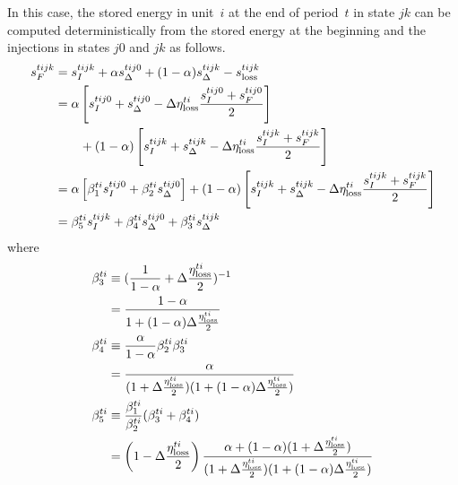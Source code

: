 \documentclass[12pt]{article}
\numberwithin{equation}{section}
\numberwithin{table}{section}
\numberwithin{figure}{section}
\begin{document}
In this case, the stored energy in unit~$i$ at the end of period~$t$ in state $jk$ can be computed deterministically from the stored energy at the beginning and the injections in states $j0$ and $jk$ as follows.
\begin{align}
s_F^{tijk} &= s_I^{tijk} + \alpha s_\Delta^{tij0} + (1 - \alpha) s_\Delta^{tijk} - s_{\rm loss}^{tijk} \\
&= \alpha \left[ s_I^{tij0} + s_\Delta^{tij0} - \Delta \eta^{ti}_{\rm loss} \frac{s_I^{tij0}+ s_F^{tij0}}{2} \right] \nonumber \\
& \qquad {} + (1-\alpha) \left[ s_I^{tijk} + s_\Delta^{tijk} - \Delta \eta^{ti}_{\rm loss} \frac{s_I^{tijk}+ s_F^{tijk}}{2} \right] \\
&= \alpha \left[ \beta_1^{ti} s_I^{tij0} + \beta_2^{ti} s_\Delta^{tij0} \right] + (1-\alpha) \left[ s_I^{tijk} + s_\Delta^{tijk} - \Delta \eta^{ti}_{\rm loss} \frac{s_I^{tijk}+ s_F^{tijk}}{2} \right] \\
&= \beta_5^{ti} s_I^{tijk} + \beta_4^{ti} s_\Delta^{tij0} + \beta_3^{ti} s_\Delta^{tijk}
\end{align}
where
\begin{align}
\beta_3^{ti} &\equiv (\frac{1}{1-\alpha} + \Delta \frac{\eta^{ti}_{\rm loss}}{2})^{-1} \nonumber \\
&= \frac{1-\alpha}{1+(1-\alpha) \Delta \frac{\eta^{ti}_{\rm loss}}{2}} \label{eq:beta3} \\
\beta_4^{ti} &\equiv \frac{\alpha}{1-\alpha}\beta_2^{ti}\beta_3^{ti} \nonumber \\
&= \frac{\alpha}{(1 + \Delta \frac{\eta^{ti}_{\rm loss}}{2})(1+(1-\alpha) \Delta \frac{\eta^{ti}_{\rm loss}}{2})} \label{eq:beta4} \\
\beta_5^{ti} &\equiv \frac{\beta_1^{ti}}{\beta_2^{ti}} (\beta_3^{ti} + \beta_4^{ti}) \nonumber \\
&= \left(1 - \Delta \frac{\eta^{ti}_{\rm loss}}{2}\right) \frac{\alpha + (1-\alpha)(1 + \Delta \frac{\eta^{ti}_{\rm loss}}{2})}{(1 + \Delta \frac{\eta^{ti}_{\rm loss}}{2})(1+(1-\alpha) \Delta \frac{\eta^{ti}_{\rm loss}}{2})} \label{eq:beta5}
\end{align}
\end{document}
